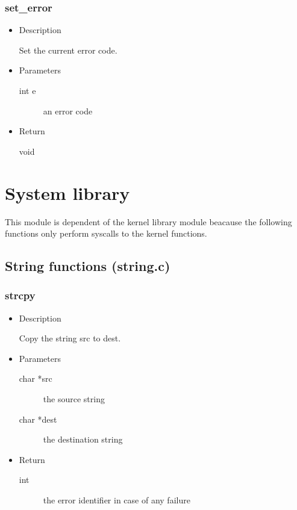 \subsubsection{set\_error}
\begin{itemize}
  \item{Description}

	 Set the current error code.
  \item{Parameters}
	 \begin{description}
		\item[int e] an error code
	 \end{description}
  \item{Return}
	 \begin{description}
		\item[void]
	 \end{description}
\end{itemize}

\section{System library}

This module is dependent of the kernel library module beacause the following
functions only perform syscalls to the kernel functions.

\subsection{String functions (string.c)}

\subsubsection{strcpy}
\begin{itemize}
  \item{Description}

	 Copy the string src to dest.
  \item{Parameters}
	 \begin{description}
		\item[char *src] the source string
		\item[char *dest] the destination string
	 \end{description}
  \item{Return}
	 \begin{description}
		\item[int] the error identifier in case of any failure
	 \end{description}
\end{itemize}


